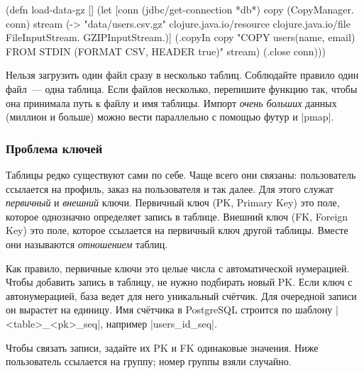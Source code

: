
\begin{english}
  \begin{clojure}
(defn load-data-gz []
  (let [conn (jdbc/get-connection *db*)
        copy (CopyManager. conn)
        stream (-> "data/users.csv.gz"
                   clojure.java.io/resource
                   clojure.java.io/file
                   FileInputStream.
                   GZIPInputStream.)]
    (.copyIn copy "COPY users(name, email)
                   FROM STDIN (FORMAT CSV, HEADER true)"
             stream)
    (.close conn)))
  \end{clojure}
\end{english}

Нельзя загрузить один файл сразу в несколько таблиц. Соблюдайте правило один
файл~--- одна таблица. Если файлов несколько, перепишите функцию так, чтобы она
принимала путь к файлу и имя таблицы. Импорт \emph{очень больших} данных
(миллион и больше) можно вести параллельно с помощью футур и \spverb|pmap|.

\subsubsection*{Проблема ключей}



Таблицы редко существуют сами по себе. Чаще всего они связаны: пользователь
ссылается на профиль, заказ на пользователя и так далее. Для этого служат
\emph{первичный} и \emph{внешний} ключи. Первичный ключ (PK, Primary Key) это
поле, которое однозначно определяет запись в таблице. Внешний ключ (FK, Foreign
Key) это поле, которое ссылается на первичный ключ другой таблицы. Вместе они
называются \emph{отношением} таблиц.


Как правило, первичные ключи это целые числа с автоматической нумерацией. Чтобы
добавить запись в таблицу, не нужно подбирать новый PK. Если ключ с
автонумерацией, база ведет для него уникальный сч\"{е}тчик. Для очередной записи
он вырастет на единицу. Имя сч\"{е}тчика в PostgreSQL строится по шаблону
\spverb|<table>_<pk>_seq|, например \spverb|users_id_seq|.

Чтобы связать записи, задайте их PK и FK одинаковые значения. Ниже пользователь
ссылается на группу; номер группы взяли случайно.

